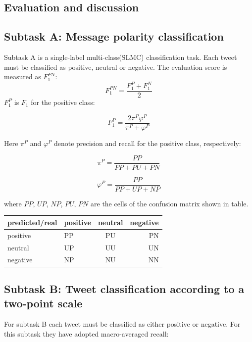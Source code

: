 \documentclass[runningheads,a4paper]{llncs}
\begin{document}
\subsection{Evaluation and discussion}


\subsection{Subtask A: Message polarity classification}
Subtask A is a single-label multi-class(SLMC) classification task. Each tweet must be classified as positive, neutral or negative. The evaluation score is measured as $F^{PN}_1$:
\begin{equation}
F^{PN}_1 = \frac{F^P_1 + F^N_1}{2}
\end{equation}
$F_1^P$ is $F_1$ for the positive class:

\begin{equation}
F^{P}_1 = \frac{2\pi^P\varphi^P}{\pi^P + \varphi^P}
\end{equation}

Here $\pi^P$ and $\varphi^P$ denote precision and recall for the positive class, respectively: 

\begin{equation}
\pi^P = \frac{PP}{PP + PU + PN}
\end{equation}

\begin{equation}
\varphi^P = \frac{PP}{PP + UP + NP}
\end{equation}

where $PP$, $UP$, $NP$, $PU$, $PN$ are the cells of the confusion matrix shown in table. 

\begin{center}
  \begin{tabular}{ | l | l | c | r |}
    \hline
  predicted/real   & positive & neutral & negative \\ \hline
   positive  & PP & PU & PN \\ \hline
   neutral  & UP & UU & UN \\ \hline
   negative  & NP & NU & NN \\
    \hline
  \end{tabular}
\end{center}

\subsection{Subtask B: Tweet classification according to a two-point scale}
For subtask B each tweet must be classified as either positive or negative. For this subtask they have adopted macro-averaged recall: 
\end{document}
